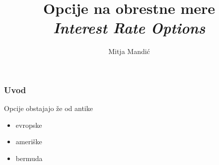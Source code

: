 \documentclass[14pt]{beamer}
\begin{document}
\title{Opcije na obrestne mere \\ \textit{Interest Rate Options}}
\author{Mitja Mandić}

\begin{frame}
    \titlepage
\end{frame}

\begin{frame}
    \frametitle{Uvod}
    Opcije obstajajo že od antike
    \pause
    \begin{itemize}
        \item evropske
        \pause
        \item ameriške
        \pause
        \item bermuda
    \end{itemize}

\end{frame}
\end{document}
